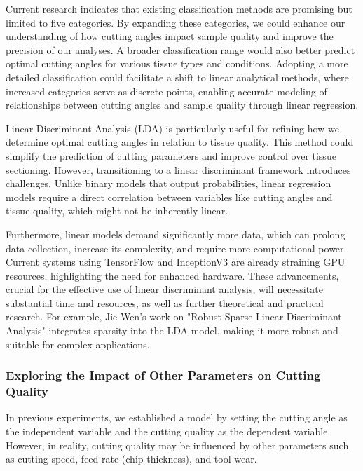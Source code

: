 Current research indicates that existing classification methods are promising but limited to five categories. By expanding these categories, we could enhance our understanding of how cutting angles impact sample quality and improve the precision of our analyses. A broader classification range would also better predict optimal cutting angles for various tissue types and conditions. Adopting a more detailed classification could facilitate a shift to linear analytical methods, where increased categories serve as discrete points, enabling accurate modeling of relationships between cutting angles and sample quality through linear regression.

Linear Discriminant Analysis (LDA) is particularly useful for refining how we determine optimal cutting angles in relation to tissue quality. This method could simplify the prediction of cutting parameters and improve control over tissue sectioning. However, transitioning to a linear discriminant framework introduces challenges. Unlike binary models that output probabilities, linear regression models require a direct correlation between variables like cutting angles and tissue quality, which might not be inherently linear.

Furthermore, linear models demand significantly more data, which can prolong data collection, increase its complexity, and require more computational power. Current systems using TensorFlow and InceptionV3 are already straining GPU resources, highlighting the need for enhanced hardware. These advancements, crucial for the effective use of linear discriminant analysis, will necessitate substantial time and resources, as well as further theoretical and practical research. For example, Jie Wen's work on "Robust Sparse Linear Discriminant Analysis" integrates sparsity into the LDA model, making it more robust and suitable for complex applications\cite{6.1}.


\subsubsection{Exploring the Impact of Other Parameters on Cutting Quality}

In previous experiments, we established a model by setting the cutting angle as the independent variable and the cutting quality as the dependent variable. However, in reality, cutting quality may be influenced by other parameters such as cutting speed, feed rate (chip thickness), and tool wear.

